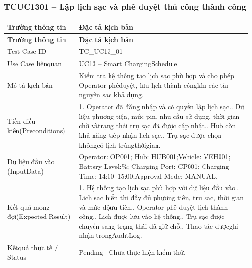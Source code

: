 \subsubsection{TCUC1301 – Lập lịch sạc và phê duyệt thủ công thành công}
\begin{longtable}{|L{0.24\textwidth}|L{0.70\textwidth}|}
\hline
\textbf{Trường thông tin} & \textbf{Đặc tả kịch bản} \\
\hline
\endfirsthead
\hline
\textbf{Trường thông tin} & \textbf{Đặc tả kịch bản} \\
\hline
\endhead
Test Case ID & TC\_UC13\_01 \\
\hline
Use Case liênquan & UC13 – Smart ChargingSchedule \\
\hline
Mô tả kịch bản & Kiểm tra hệ thống tạo lịch sạc phù hợp và cho phép Operator phê\newline duyệt, lưu lịch thành côngkhi các tài nguyên sạc khả dụng. \\
\hline
Tiền điều kiện\newline (Preconditions) & 1. Operator đã đăng nhập và có quyền lập lịch sạc.. Dữ liệu phương tiện, mức pin, nhu cầu sử dụng, thời gian chờ và\newline trạng thái trụ sạc đã được cập nhật.. Hub còn khả năng tiếp nhận lịch sạc.. Trụ sạc được chọn khôngcó lịch trùngthờigian. \\
\hline
Dữ liệu đầu vào (Input\newline Data) & Operator: OP001; Hub: HUB001;Vehicle: VEH001; Battery Level:\%; Charging Port: CP001; Charging Time: 14:00–15:00;\newline Approval Mode: MANUAL. \\
\hline
Kết quả mong đợi\newline (Expected Result) & 1. Hệ thống tạo lịch sạc phù hợp với dữ liệu đầu vào.. Lịch sạc hiển thị đầy đủ phương tiện, trụ sạc, thời gian và mức độ\newline ưu tiên.. Operator phê duyệt lịch thành công.. Lịch được lưu vào hệ thống.. Trụ sạc được chuyển sang trạng thái đã giữ chỗ.. Thao tác đượcghi nhận trongAuditLog. \\
\hline
Kếtquả thực tế / Status & Pending– Chưa thực hiện kiểm thử. \\
\hline
\end{longtable}
\vspace{-0.5\baselineskip}
